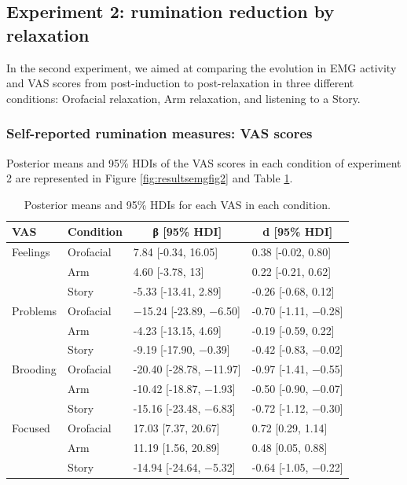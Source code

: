 \documentclass[a4paper,12pt,twoside,onecolumn,openright,final,oldfontcommands]{memoir}
\begin{document}
\hypertarget{experiment-2-rumination-reduction-by-relaxation-1}{%
\subsection{Experiment 2: rumination reduction by relaxation}\label{experiment-2-rumination-reduction-by-relaxation-1}}

In the second experiment, we aimed at comparing the evolution in EMG activity and VAS scores from post-induction to post-relaxation in three different conditions: Orofacial relaxation, Arm relaxation, and listening to a Story.

\hypertarget{self-reported-rumination-measures-vas-scores-1}{%
\subsubsection{Self-reported rumination measures: VAS scores}\label{self-reported-rumination-measures-vas-scores-1}}

Posterior means and 95\% HDIs of the VAS scores in each condition of experiment 2 are represented in Figure \ref{fig:resultsemgfig2} and Table \ref{tab:table2}.

\begin{table}[H]
\begin{center}
\begin{threeparttable}
\caption{\label{tab:table2}Posterior means and 95\% HDIs for each VAS in each condition.}
\small{
\begin{tabular}{llll}
\toprule
VAS & \multicolumn{1}{c}{Condition} & \multicolumn{1}{c}{β [95\% HDI]} & \multicolumn{1}{c}{d [95\% HDI]}\\
\midrule
Feelings & Orofacial & 7.84 [-0.34, 16.05] & 0.38 [-0.02, 0.80]\\
 & Arm & 4.60 [-3.78, 13] & 0.22 [-0.21, 0.62]\\
 & Story & -5.33 [-13.41, 2.89] & -0.26 [-0.68, 0.12]\\
Problems & Orofacial & −15.24 [-23.89, −6.50] & -0.70 [-1.11, −0.28]\\
 & Arm & -4.23 [-13.15, 4.69] & -0.19 [-0.59, 0.22]\\
 & Story & -9.19 [-17.90, −0.39] & -0.42 [-0.83, −0.02]\\
Brooding & Orofacial & -20.40 [-28.78, −11.97] & -0.97 [-1.41, −0.55]\\
 & Arm & -10.42 [-18.87, −1.93] & -0.50 [-0.90, −0.07]\\
 & Story & -15.16 [-23.48, −6.83] & -0.72 [-1.12, −0.30]\\
Focused & Orofacial & 17.03 [7.37, 20.67] & 0.72 [0.29, 1.14]\\
 & Arm & 11.19 [1.56, 20.89] & 0.48 [0.05, 0.88]\\
 & Story & -14.94 [-24.64, −5.32] & -0.64 [-1.05, −0.22]\\
\bottomrule
\end{tabular}
}
\end{threeparttable}
\end{center}
\end{table}
\end{document}
